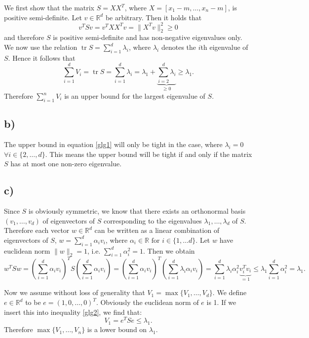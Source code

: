 \documentclass[paper=a4,fontsize=10pt,DIV11,BCOR10mm]{scrartcl}
\DeclareMathOperator{\tr}{tr}
\begin{document}
We first show that the matrix $S=XX^T$, where $X=[x_1-m,\dots, x_n-m]$,  is positive semi-definite. Let $v \in \mathbb{R}^d$ be arbitrary. Then it holds that
\begin{equation*}
v^TSv=v^TXX^Tv=\lVert X^Tv\rVert_2^2 \geq 0
\end{equation*}
and therefore $S$ is positive semi-definite and has non-negative eigenvalues only.
We now use the relation $\tr S=\sum_{i=1}^d \lambda_i$, where $\lambda_i$ denotes the $i$th eigenvalue of $S$.
Hence it follows that
\begin{equation}\label{glg1}
\sum_{i=1}^d V_i=\tr S=\sum_{i=1}^d \lambda_i= \lambda_1 + \underbrace{\sum_{i=2}^d \lambda_i}_{\geq 0} \geq \lambda_1\text{.}
\end{equation}
Therefore $\sum_{i=1}^n V_i$ is an upper bound for the largest eigenvalue of $S$.


\subsection*{b)}

The upper bound in equation \ref{glg1} will only be tight in the case, where $\lambda_i=0$ $\forall i \in \{2,\dots,d\}$. This means the upper bound will be tight if and only if the matrix $S$ has at most one non-zero eigenvalue.


\subsection*{c)}

Since $S$ is obviously symmetric, we know that there exists an orthonormal basis $(v_1,\dots,v_d)$ of eigenvectors of $S$ corresponding to the eigenvalues $\lambda_1,\dots,\lambda_d$ of $S$. Therefore each vector $w\in \mathbb{R}^d$ can be written as a linear combination of eigenvectors of $S$, $w=\sum_{i=1}^d \alpha_iv_i$, where $\alpha_i \in \mathbb{R} \text{ for } i \in \{1,\dots d\}$.
Let $w$ have euclidean norm $\lVert w \rVert_2=1$, i.e. $\sum_{i=1}^d \alpha_i^2=1$. Then we obtain
\begin{equation}\label{glg2}
w^TSw=(\sum_{i=1}^d \alpha_iv_i)^TS(\sum_{i=1}^d \alpha_iv_i)=(\sum_{i=1}^d \alpha_iv_i)^T(\sum_{i=1}^d \lambda_i \alpha_i v_i)
=\sum_{i=1}^d \lambda_i\alpha_i^2 \underbrace{v_i^Tv_i}_{=1} \leq \lambda_1 \sum_{i=1}^d\alpha_i^2=\lambda_1\text{.}
\end{equation} 

Now we assume without loss of generality that $V_1=\max\{V_1,\dots,V_d\}$. We define $e\in \mathbb{R}^d$ to be $e=(1,0,\dots,0)^T$. Obviously the euclidean norm of $e$ is 1. If we insert this into inequality \ref{glg2}, we find that:
\begin{equation*}
V_1=e^TSe \leq \lambda_1\text{.}
\end{equation*}
Therefore $\max\{V_1,\dots,V_n\}$ is a lower bound on $\lambda_1$.
\end{document}
